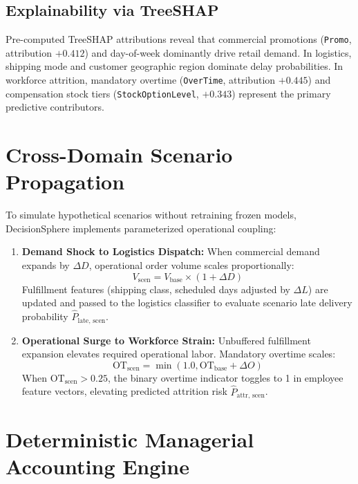 \documentclass[10pt,conference]{IEEEtran}
\begin{document}
\subsection{Explainability via TreeSHAP}
Pre-computed TreeSHAP attributions \cite{lundberg2020treeshap} reveal that commercial promotions (\texttt{Promo}, attribution $+0.412$) and day-of-week dominantly drive retail demand. In logistics, shipping mode and customer geographic region dominate delay probabilities. In workforce attrition, mandatory overtime (\texttt{OverTime}, attribution $+0.445$) and compensation stock tiers (\texttt{StockOptionLevel}, $+0.343$) represent the primary predictive contributors.

\section{Cross-Domain Scenario Propagation}

To simulate hypothetical scenarios without retraining frozen models, DecisionSphere implements parameterized operational coupling:
\begin{enumerate}
    \item \textbf{Demand Shock to Logistics Dispatch:} When commercial demand expands by $\Delta D$, operational order volume scales proportionally:
    \begin{equation}
    V_{\text{scen}} = V_{\text{base}} \times (1 + \Delta D)
    \end{equation}
    Fulfillment features (shipping class, scheduled days adjusted by $\Delta L$) are updated and passed to the logistics classifier to evaluate scenario late delivery probability $\hat{P}_{\text{late, scen}}$.
    \item \textbf{Operational Surge to Workforce Strain:} Unbuffered fulfillment expansion elevates required operational labor. Mandatory overtime scales:
    \begin{equation}
    \text{OT}_{\text{scen}} = \min(1.0, \text{OT}_{\text{base}} + \Delta O)
    \end{equation}
    When $\text{OT}_{\text{scen}} > 0.25$, the binary overtime indicator toggles to 1 in employee feature vectors, elevating predicted attrition risk $\hat{P}_{\text{attr, scen}}$.
\end{enumerate}

\section{Deterministic Managerial Accounting Engine}
\end{document}
